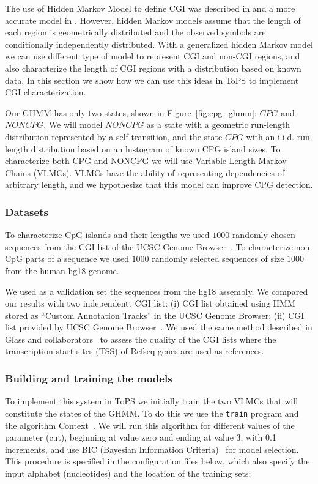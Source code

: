 \documentclass[10pt]{article}
\begin{document}
 The use of Hidden Markov Model to define CGI was described in \cite{Durbin1998} and a more accurate model in \cite{Wu2010}. However, hidden Markov models assume that the length of each region is geometrically distributed and the observed symbols are conditionally independently distributed. With a generalized hidden Markov model we can use different type of model to represent CGI and non-CGI regions, and also characterize the length of CGI regions with  a  distribution based on known data. In this section we show how we can use this ideas in ToPS to implement CGI characterization.

 Our GHMM has only two states, shown in Figure~\ref{fig:cpg_ghmm}: $CPG$ and $NONCPG$. We will model $NONCPG$  as a state with a geometric run-length distribution represented by a self transition, and  the state $CPG$ with  an i.i.d. run-length distribution  based on an histogram of known CPG island sizes.  To characterize both CPG and NONCPG we will use Variable Length Markov Chains (VLMCs).  VLMCs have the ability of representing dependencies of arbitrary length, and we hypothesize that this model can improve CPG detection.  

\subsubsection*{Datasets}

To characterize CpG islands and their lengths we used $1000$  randomly  chosen sequences from the  CGI list of the UCSC Genome Browser~\cite{Kent2002}. To characterize non-CpG parts of a sequence we used $1000$ randomly selected sequences of size $1000$ from the human hg18 genome. 

We used as a validation set the sequences from the hg18 assembly. We compared our results with two independentt CGI list: (i) CGI list obtained using HMM~\cite{Wu2010} stored as ``Custom Annotation Tracks'' in the UCSC Genome Browser; (ii) CGI list provided by UCSC Genome Browser~\cite{Kent2002}. We used the same method described in Glass and collaborators~\cite{Glass2007} to assess the quality of the CGI lists where the transcription start sites (TSS) of Refseq genes are used as references.


\subsubsection*{Building and training the models} 

To implement this system in ToPS we initially train the two VLMCs that will constitute the states of the GHMM. To do this we use the \texttt{train}  program  and the algorithm Context~\cite{Rissanen1983,Galves2008}. We will run this algorithm for different values of the parameter (cut), beginning at value zero and ending at value 3, with 0.1 increments, and use BIC (Bayesian Information Criteria)~\cite{Schwarz1978} for model selection. This procedure is specified in the configuration files below, which also specify the input alphabet (nucleotides) and the location of the training sets:
\end{document}
